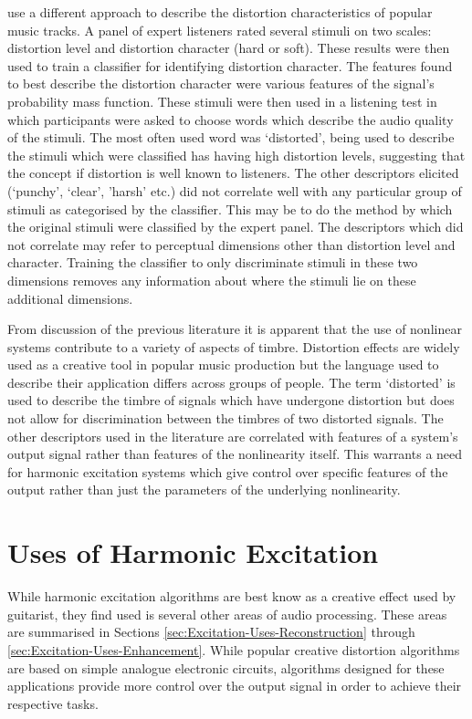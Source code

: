 	\citet{wilson2014characterisation} use a different approach to describe the distortion characteristics of popular
	music tracks. A panel of expert listeners rated several stimuli on two scales: distortion level and distortion
	character (hard or soft). These results were then used to train a classifier for identifying distortion character.
	The features found to best describe the distortion character were various features of the signal's probability mass
	function. These stimuli were then used in a listening test in which participants were asked to choose words which
	describe the audio quality of the stimuli. The most often used word was `distorted', being used to describe the
	stimuli which were classified has having high distortion levels, suggesting that the concept if distortion is well
	known to listeners. The other descriptors elicited (`punchy', `clear', 'harsh' etc.) did not correlate well with any
	particular group of stimuli as categorised by the classifier. This may be to do the method by which the original
	stimuli were classified by the expert panel. The descriptors which did not correlate may refer to perceptual
	dimensions other than distortion level and character. Training the classifier to only discriminate stimuli in these
	two dimensions removes any information about where the stimuli lie on these additional dimensions.

	From discussion of the previous literature it is apparent that the use of nonlinear systems contribute to a variety
	of aspects of timbre. Distortion effects are widely used as a creative tool in popular music production but the
	language used to describe their application differs across groups of people. The term `distorted' is used to
	describe the timbre of signals which have undergone distortion but does not allow for discrimination between the
	timbres of two distorted signals. The other descriptors used in the literature are correlated with features of a
	system's output signal rather than features of the nonlinearity itself. This warrants a need for harmonic excitation
	systems which give control over specific features of the output rather than just the parameters of the underlying
	nonlinearity. 

\section{Uses of Harmonic Excitation}
\label{sec:Excitation-Uses}
	While harmonic excitation algorithms are best know as a creative effect used by guitarist, they find used is several
	other areas of audio processing. These areas are summarised in Sections \ref{sec:Excitation-Uses-Reconstruction}
	through \ref{sec:Excitation-Uses-Enhancement}. While popular creative distortion algorithms are based on simple
	analogue electronic circuits, algorithms designed for these applications provide more control over the output signal
	in order to achieve their respective tasks.

